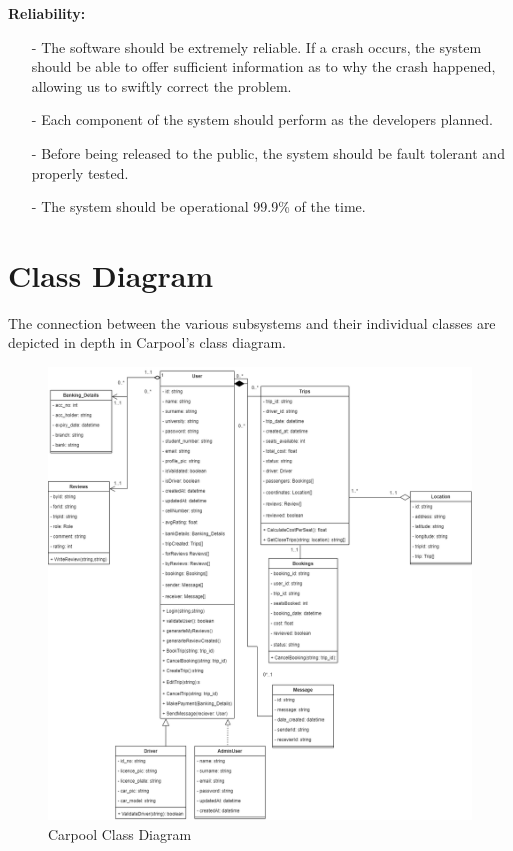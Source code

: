 \documentclass[hidelinks, 12pt, a4paper]{article}
\begin{document}
\vspace{0.5cm}
\large{ \textbf{Reliability:}}
\begin{itemize}
      \item[-] The software should be extremely reliable. If a crash occurs, the system should be able to offer sufficient information as to why the crash happened, allowing us to swiftly correct the problem.
      \item[-] Each component of the system should perform as the developers planned.
      \item[-] Before being released to the public, the system should be fault tolerant and properly tested.
      \item[-] 	The system should be operational 99.9\% of the time.

\end{itemize}


\newpage
\section{Class Diagram}
The connection between the various subsystems and their individual classes are depicted in depth in Carpool’s class diagram.
\vspace{1.5cm}

\begin{figure}[H]

      \centering
      \includegraphics[scale=0.45]{images/Carpool_Class_Diagram.drawio.png}
      \caption{Carpool Class Diagram}
      \label{fig:ClassDiagram}

\end{figure}
\newpage
\end{document}
